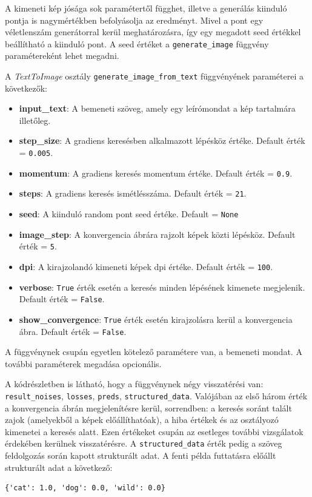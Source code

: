 A kimeneti kép jósága sok paramétertől függhet, illetve a generálás kiinduló pontja is nagymértékben befolyásolja az eredményt. Mivel a pont egy véletlenszám generátorral kerül meghatározásra, így egy megadott seed értékkel beállítható a kiinduló pont. A seed értéket a \texttt{generate\_image} függvény paramétereként lehet megadni.

A \textit{TextToImage} osztály \texttt{generate\_image\_from\_text} függvényének paraméterei a következők:

\begin{itemize}
	\item \textbf{input\_text}: A bemeneti szöveg, amely egy leírómondat a kép tartalmára illetőleg.
	\item \textbf{step\_size}: A gradiens keresésben alkalmazott lépésköz értéke. Default érték = \texttt{0.005}.
	\item \textbf{momentum}: A gradiens keresés momentum értéke. Default érték = \texttt{0.9}.
	\item \textbf{steps}: A gradiens keresés ismétlésszáma. Default érték = \texttt{21}.
	\item \textbf{seed}: A kiinduló random pont seed értéke. Default = \texttt{None}
	\item \textbf{image\_step}: A konvergencia ábrára rajzolt képek közti lépésköz. Default érték = \texttt{5}.
	\item \textbf{dpi}: A kirajzolandó kimeneti képek dpi értéke. Default érték = \texttt{100}.
	\item \textbf{verbose}: \texttt{True} érték esetén a keresés minden lépésének kimenete megjelenik. Default érték = \texttt{False}.
	\item \textbf{show\_convergence}: \texttt{True} érték esetén kirajzolásra kerül a konvergencia ábra. Default érték = \texttt{False}.
\end{itemize}

A függvénynek csupán egyetlen kötelező paramétere van, a bemeneti mondat. A további paraméterek megadása opcionális.

A kódrészletben is látható, hogy a függvénynek négy visszatérési van: \texttt{result\_noises}, \texttt{losses}, \texttt{preds}, \texttt{structured\_data}. Valójában az első három érték a konvergencia ábrán megjelenítésre kerül, sorrendben: a keresés soránt talált zajok (amelyekből a képek előállíthatóak), a hiba értékek és az osztályozó kimenetei a keresés alatt. Ezen értékeket csupán az esetleges további vizsgálatok érdekében kerülnek visszatérésre. A \texttt{structured\_data} érték pedig a szöveg feldolgozás során kapott strukturált adat.
A fenti példa futtatásra előállt strukturált adat a következő:
\begin{verbatim}
{'cat': 1.0, 'dog': 0.0, 'wild': 0.0}
\end{verbatim}

